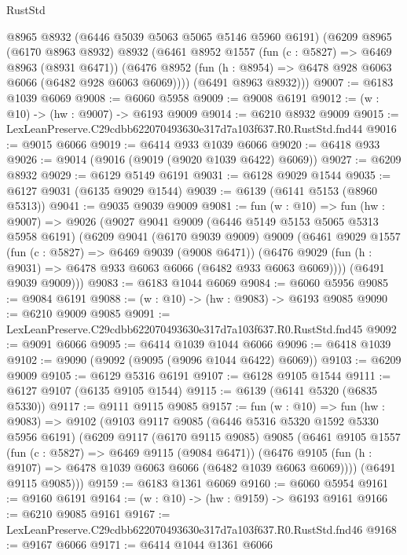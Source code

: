 \begin{lexlean}{RustStd}
\begin{coremodule}
      @8965
      @8932
      (@6446 @5039 @5063 @5065 @5146 @5960 @6191)
      (@6209
        @8965
        (@6170 @8963 @8932)
        @8932
        (@6461
          @8952
          @1557
          (fun (c : @5827) => @6469 @8963 (@8931 @6471))
          (@6476 @8952 (fun (h : @8954) => @6478 @928 @6063 @6066 (@6482 @928 @6063 @6069))))
        (@6491 @8963 @8932)))
@9007 := @6183 @1039 @6069
@9008 := @6060 @5958
@9009 := @9008 @6191
@9012 := (w : @10) -> (hw : @9007) -> @6193 @9009
@9014 := @6210 @8932 @9009
@9015 := LexLeanPreserve.C29cdbb622070493630e317d7a103f637.R0.RustStd.fnd44
@9016 := @9015 @6066
@9019 := @6414 @933 @1039 @6066
@9020 := @6418 @933
@9026 := @9014 (@9016 (@9019 (@9020 @1039 @6422) @6069))
@9027 := @6209 @8932
@9029 := @6129 @5149 @6191
@9031 := @6128 @9029 @1544
@9035 := @6127 @9031 (@6135 @9029 @1544)
@9039 := @6139 (@6141 @5153 (@8960 @5313))
@9041 := @9035 @9039 @9009
@9081 := fun (w : @10) =>
  fun (hw : @9007) =>
  @9026
    (@9027
      @9041
      @9009
      (@6446 @5149 @5153 @5065 @5313 @5958 @6191)
      (@6209
        @9041
        (@6170 @9039 @9009)
        @9009
        (@6461
          @9029
          @1557
          (fun (c : @5827) => @6469 @9039 (@9008 @6471))
          (@6476 @9029 (fun (h : @9031) => @6478 @933 @6063 @6066 (@6482 @933 @6063 @6069))))
        (@6491 @9039 @9009)))
@9083 := @6183 @1044 @6069
@9084 := @6060 @5956
@9085 := @9084 @6191
@9088 := (w : @10) -> (hw : @9083) -> @6193 @9085
@9090 := @6210 @9009 @9085
@9091 := LexLeanPreserve.C29cdbb622070493630e317d7a103f637.R0.RustStd.fnd45
@9092 := @9091 @6066
@9095 := @6414 @1039 @1044 @6066
@9096 := @6418 @1039
@9102 := @9090 (@9092 (@9095 (@9096 @1044 @6422) @6069))
@9103 := @6209 @9009
@9105 := @6129 @5316 @6191
@9107 := @6128 @9105 @1544
@9111 := @6127 @9107 (@6135 @9105 @1544)
@9115 := @6139 (@6141 @5320 (@6835 @5330))
@9117 := @9111 @9115 @9085
@9157 := fun (w : @10) =>
  fun (hw : @9083) =>
  @9102
    (@9103
      @9117
      @9085
      (@6446 @5316 @5320 @1592 @5330 @5956 @6191)
      (@6209
        @9117
        (@6170 @9115 @9085)
        @9085
        (@6461
          @9105
          @1557
          (fun (c : @5827) => @6469 @9115 (@9084 @6471))
          (@6476 @9105 (fun (h : @9107) => @6478 @1039 @6063 @6066 (@6482 @1039 @6063 @6069))))
        (@6491 @9115 @9085)))
@9159 := @6183 @1361 @6069
@9160 := @6060 @5954
@9161 := @9160 @6191
@9164 := (w : @10) -> (hw : @9159) -> @6193 @9161
@9166 := @6210 @9085 @9161
@9167 := LexLeanPreserve.C29cdbb622070493630e317d7a103f637.R0.RustStd.fnd46
@9168 := @9167 @6066
@9171 := @6414 @1044 @1361 @6066

\end{coremodule}
\end{lexlean}
